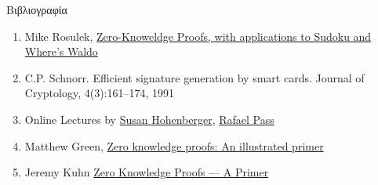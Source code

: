 \documentclass[10pt,handout]{beamer}
\begin{document}
\begin{frame}[allowframebreaks]{Βιβλιογραφία}
\begin{tiny}
\begin{enumerate}
\item Mike Rosulek, \href{http://web.engr.oregonstate.edu/~rosulekm/pubs/zk-waldo-talk.pdf}{Zero-Knoweldge Proofs, with applications to Sudoku and Where’s Waldo}
\item  C.P. Schnorr. Efficient signature generation by smart cards. Journal of Cryptology, 4(3):161–174, 1991
\item Online Lectures by \href{http://www.cs.jhu.edu/~susan/600.641/}{Susan Hohenberger},  \href{http://www.cs.cornell.edu/courses/cs6830/2014fa/}{Rafael Pass}
\item  Matthew Green, \href{http://blog.cryptographyengineering.com/2014/11/zero-knowledge-proofs-illustrated-primer.html}{Zero knowledge proofs: An illustrated primer}
\item Jeremy Kuhn \href{https://jeremykun.com/2016/07/05/zero-knowledge-proofs-a-primer/}{Zero Knowledge Proofs — A Primer}
\end{enumerate}
\end{tiny}
\end{frame}
\end{document}
